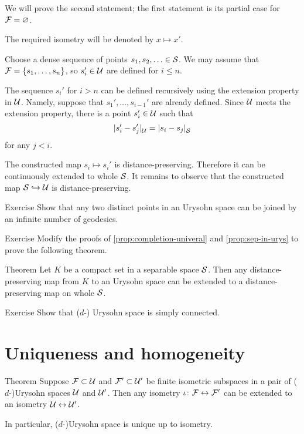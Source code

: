 We will prove the second statement;
the first statement is its partial case for $\mathcal{F}=\varnothing$.

The required isometry will be denoted by $x\mapsto x'$.

Choose a dense sequence of points $s_1,s_2,\dotsc\in\mathcal{S}$.
We may assume that $\mathcal{F}=\{s_1,\dots,s_n\}$, so $s_i'\in \mathcal{U}$ are defined for $i\le n$.

The sequence $s_i'$ for $i>n$ can be defined recursively using the extension property in $\mathcal{U}$.
Namely, suppose that $s_1',\dots,s_{i-1}'$ are already defined.
Since $\mathcal{U}$ meets the extension property, there is a point $s_i'\in \mathcal{U}$ such that
\[\dist{s_i'}{s_j'}{\spc{U}}=\dist{s_i}{s_j}{\spc{S}}\]
for any $j<i$.

The constructed map $s_i\mapsto s_i'$ is distance-preserving.
Therefore it can be continuously extended to whole $\mathcal{S}$.
It remains to observe that the constructed map $\mathcal{S}\hookrightarrow\mathcal{U}$ is distance-preserving.
\qeds

\begin{thm}{Exercise}\label{ex:geodesics-urysohn}
Show that any two distinct points in an Urysohn space can be joined by an infinite number of geodesics.
\end{thm}

\begin{thm}{Exercise}\label{ex:compact-extension}
Modify the proofs of \ref{prop:completion-univeral} and \ref{prop:sep-in-urys} to prove the following theorem.
\end{thm}

\begin{thm}{Theorem}\label{thm:compact-extension}
Let $K$ be a compact set in a separable space $\mathcal{S}$.
Then any distance-preserving map from $K$ to an Urysohn space can be extended to 
a distance-preserving map on whole $\mathcal{S}$.
\end{thm}

\begin{thm}{Exercise}\label{ex:sc-urysohn}
Show that ($d$-) Urysohn space is simply connected.
\end{thm}



\section{Uniqueness and homogeneity}

\begin{thm}{Theorem}\label{thm:urysohn-unique}
Suppose $\mathcal{F}\subset \mathcal{U}$ and $\mathcal{F}'\subset \mathcal{U}'$ be finite isometric subspaces in a pair of ($d$-)Urysohn spaces $\mathcal{U}$ and $\mathcal{U}'$.
Then any isometry $\iota\colon\mathcal{F}\leftrightarrow \mathcal{F}'$ can be extended to an isometry $\mathcal{U}\leftrightarrow \mathcal{U}'$.

In particular, ($d$-)Urysohn space is unique up to isometry.
\end{thm}

